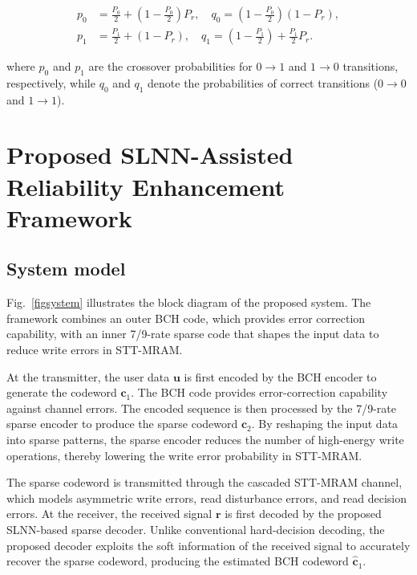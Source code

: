 \documentclass[conference]{IEEEtran}
\begin{document}
\begin{equation}
\begin{aligned}
p_0 &= \frac{P_0}{2} + \left(1 - \frac{P_0}{2}\right) P_r, \quad
q_0 = \left(1 - \frac{P_0}{2}\right)(1 - P_r), \\
p_1 &= \frac{P_1}{2} + (1 - P_r), \quad
q_1 = \left(1 - \frac{P_1}{2}\right) + \frac{P_1}{2} P_r.
\end{aligned}
\end{equation}

where $p_0$ and $p_1$ are the crossover probabilities for $0\rightarrow1$ and $1\rightarrow0$ transitions, respectively, while $q_0$ and $q_1$ denote the probabilities of correct transitions ($0\rightarrow0$ and $1\rightarrow1$).




\section{Proposed SLNN-Assisted Reliability Enhancement Framework}
\subsection{System model}

Fig.~\ref{figsystem} illustrates the block diagram of the proposed system. The framework combines an outer BCH code, which provides error correction capability, with an inner 7/9-rate sparse code that shapes the input data to reduce write errors in STT-MRAM.

At the transmitter, the user data $\mathbf{u}$ is first encoded by the BCH encoder to generate the codeword $\mathbf{c}_1$. The BCH code provides error-correction capability against channel errors. The encoded sequence is then processed by the 7/9-rate sparse encoder to produce the sparse codeword $\mathbf{c}_2$. By reshaping the input data into sparse patterns, the sparse encoder reduces the number of high-energy write operations, thereby lowering the write error probability in STT-MRAM.

The sparse codeword is transmitted through the cascaded STT-MRAM channel, which models asymmetric write errors, read disturbance errors, and read decision errors. At the receiver, the received signal $\mathbf{r}$ is first decoded by the proposed SLNN-based sparse decoder. Unlike conventional hard-decision decoding, the proposed decoder exploits the soft information of the received signal to accurately recover the sparse codeword, producing the estimated BCH codeword $\hat{\mathbf{c}}_1$.
\end{document}
